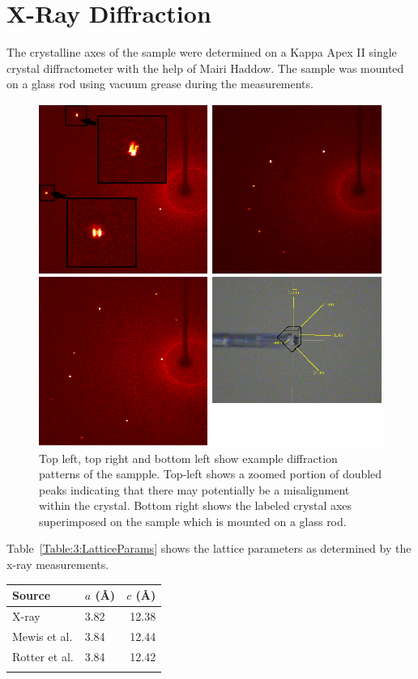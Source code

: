 
\section{X-Ray Diffraction}
    \label{Sec:3:XrayDiffraction}

The crystalline axes of the sample were determined on a Kappa Apex II single crystal diffractometer with the help of Mairi Haddow. The sample was mounted on a glass rod using vacuum grease during the measurements.
\begin{figure}[h!]
    \begin{center}
        \includegraphics[scale=0.7]{Chapter3-dHvABaFe2P2/Figures/Xrays/XRayDiffraction/XrayDiffraction}
        \caption{Top left, top right and bottom left show example diffraction patterns of the \BaFeP sampple. Top-left shows a zoomed portion of doubled peaks indicating that there may potentially be a misalignment within the crystal. Bottom right shows the labeled crystal axes superimposed on the sample which is mounted on a glass rod.}
        \label{Fig:3:XRayDiffraction}
    \end{center}
\end{figure}

Table~\ref{Table:3:LatticeParams} shows the lattice parameters as determined by the x-ray measurements.
\medskip
\begin{center}
    \begin{tabular}[h!]{llr}
\toprule
Source  &  $a$ (\AA) & $c$ (\AA) \\
\midrule
X-ray   & 3.82  & 12.38 \\
Mewis et al.\cite{Mewis1980} & 3.84 & 12.44 \\
Rotter et al.\cite{Rotter2010} & 3.84 & 12.42 \\
\bottomrule
    \label{Table:3:LatticeParams}
    \end{tabular}
\end{center}

